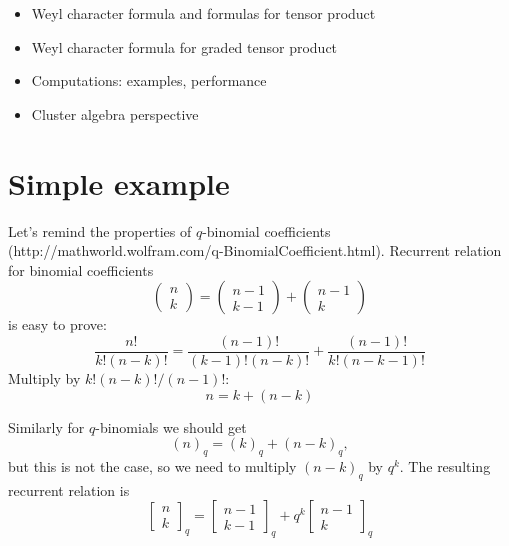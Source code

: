 \documentclass[12pt]{iopart}
\begin{document}
\begin{itemize}
\item Weyl character formula and formulas for tensor product
\item Weyl character formula for graded tensor product
\item Computations: examples, performance
\item Cluster algebra perspective
\end{itemize}

\section{Simple example}
\label{sec:simple-example}

Let's remind the properties of $q$-binomial coefficients
(http://mathworld.wolfram.com/q-BinomialCoefficient.html). Recurrent relation for binomial coefficients
\begin{equation}
  \label{eq:7}
  \left(\begin{array}{c}n\\ k\end{array}\right)=\left(\begin{array}{c}n-1\\
      k-1\end{array}\right)+\left(\begin{array}{c}n-1\\ k\end{array}\right) 
\end{equation}
is easy to prove:
\begin{equation}
  \label{eq:8}
  \frac{n!}{k!(n-k)!}=\frac{(n-1)!}{(k-1)!(n-k)!}+\frac{(n-1)!}{k!(n-k-1)!}
\end{equation}
Multiply by $k!(n-k)!/(n-1)!$:
\begin{equation}
  \label{eq:9}
  n=k+(n-k)
\end{equation}

Similarly for $q$-binomials we should get
\begin{equation}
  \label{eq:10}
  (n)_{q}=(k)_{q}+(n-k)_{q},
\end{equation}
but this is not the case, so we need to multiply $(n-k)_{q}$ by $q^{k}$. The resulting recurrent
relation is
\begin{equation}
  \label{eq:11}
  \left[\begin{array}{c}n\\ k\end{array}\right]_{q}=\left[\begin{array}{c}n-1\\ k-1\end{array}\right]_{q}+q^{k}\left[\begin{array}{c}n-1\\ k\end{array}\right]_{q}
\end{equation}
\end{document}
